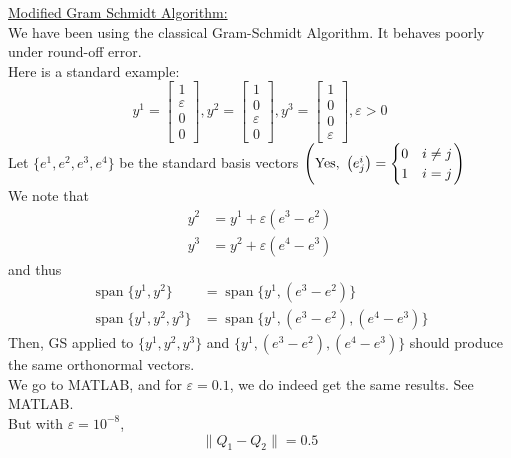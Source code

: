 \documentclass[letterpaper]{article}
\begin{document}
\underline{Modified Gram Schmidt Algorithm:}\\
    We have been using the classical Gram-Schmidt Algorithm. It behaves poorly under round-off error.\\
    Here is a standard example:
    \begin{equation*}
        y^1=\left[\begin{matrix} 1 \\ \varepsilon \\ 0 \\ 0 \end{matrix}\right],
        y^2=\left[\begin{matrix} 1 \\ 0 \\ \varepsilon \\ 0 \end{matrix}\right],
        y^3=\left[\begin{matrix} 1 \\ 0 \\ 0 \\ \varepsilon \end{matrix}\right],
        \varepsilon>0
    \end{equation*}
    Let $\{e^1,e^2,e^3,e^4\}$ be the standard basis vectors $\left(\textnormal{Yes, }\left(e_j^i\right)=\begin{cases}
        0 & i\neq j\\
        1 & i=j\\
    \end{cases}\right)$\\
    We note that
    \begin{align*}
        y^2 &= y^1+\varepsilon(e^3-e^2)\\
        y^3 &= y^2+\varepsilon(e^4-e^3)
    \end{align*}
    and thus
    \begin{align*}
        \operatorname{span}\{y^1,y^2\}&=\operatorname{span}\{y^1,(e^3-e^2)\}\\
        \operatorname{span}\{y^1,y^2,y^3\}&=\operatorname{span}\{y^1,(e^3-e^2),(e^4-e^3)\}
    \end{align*}
    Then, GS applied to $\{y^1,y^2,y^3\}$ and $\{y^1,(e^3-e^2),(e^4-e^3)\}$ should produce the same orthonormal vectors.\\
    We go to MATLAB, and for $\varepsilon=0.1$, we do indeed get the same results. See MATLAB.\\
    But with $\varepsilon=10^{-8}$,
    \begin{equation*}
        \|Q_1-Q_2\|=0.5
    \end{equation*}
\end{document}
